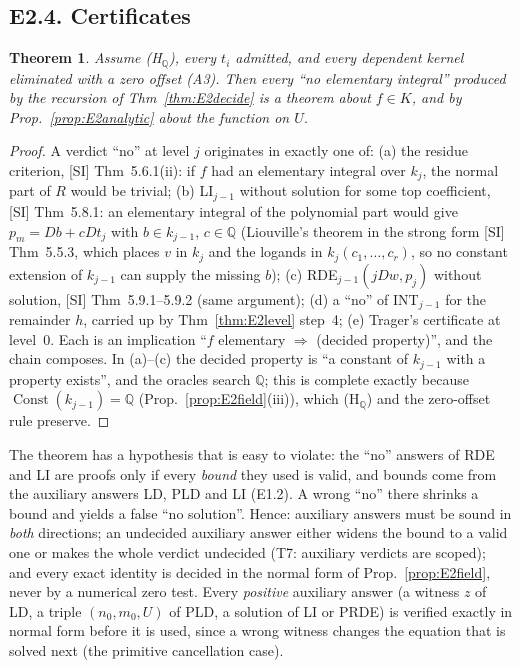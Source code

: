 \documentclass[11pt]{article}
\newtheorem{theorem}{Theorem}[section]
\theoremstyle{definition}
\theoremstyle{remark}
\newcommand{\Q}{\mathbb{Q}}
\begin{document}
\subsection*{E2.4. Certificates}

\begin{theorem}\label{thm:E2cert}
Assume (H$_\Q$), every $t_i$ admitted, and every dependent kernel eliminated with a zero
offset (A3). Then every ``no elementary integral'' produced by the recursion of
Thm~\ref{thm:E2decide} is a theorem about $f\in K$, and by Prop.~\ref{prop:E2analytic} about
the function on $U$.
\end{theorem}
\begin{proof}
A verdict ``no'' at level $j$ originates in exactly one of: (a) the residue criterion,
[SI] Thm~5.6.1(ii): if $f$ had an elementary integral over $k_j$, the normal part of $R$
would be trivial; (b) LI$_{j-1}$ without solution for some top coefficient, [SI]
Thm~5.8.1: an elementary integral of the polynomial part would give $p_m=Db+cDt_j$ with
$b\in k_{j-1}$, $c\in\Q$ (Liouville's theorem in the strong form [SI] Thm~5.5.3, which
places $v$ in $k_j$ and the logands in $k_j(c_1,\dots,c_r)$, so no constant extension
of $k_{j-1}$ can supply the missing $b$); (c) RDE$_{j-1}(jDw,p_j)$ without solution, [SI]
Thm~5.9.1--5.9.2 (same argument); (d) a ``no'' of INT$_{j-1}$ for the remainder $h$, carried
up by Thm~\ref{thm:E2level} step~4; (e) Trager's certificate at level~0. Each is an
implication ``$f$ elementary $\Rightarrow$ (decided property)'', and the chain composes.
In (a)--(c) the decided property is ``a constant of $k_{j-1}$ with a property exists'', and
the oracles search $\Q$; this is complete exactly because $\operatorname{Const}(k_{j-1})=\Q$
(Prop.~\ref{prop:E2field}(iii)), which (H$_\Q$) and the zero-offset rule preserve.
\end{proof}

The theorem has a hypothesis that is easy to violate: the ``no'' answers of RDE and LI are
proofs only if every \emph{bound} they used is valid, and bounds come from the auxiliary
answers LD, PLD and LI (E1.2). A wrong ``no'' there shrinks a bound and yields a false
``no solution''. Hence: auxiliary answers must be sound in \emph{both} directions; an
undecided auxiliary answer either widens the bound to a valid one or makes the whole verdict
undecided (T7: auxiliary verdicts are scoped); and every exact identity is decided in the
normal form of Prop.~\ref{prop:E2field}, never by a numerical zero test. Every
\emph{positive} auxiliary answer (a witness $z$ of LD, a triple $(n_0,m_0,U)$ of PLD, a
solution of LI or PRDE) is verified exactly in normal form before it is used, since a wrong
witness changes the equation that is solved next (the primitive cancellation case).
\end{document}
